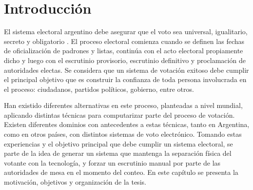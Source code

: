 \label{Introduccion}
\chapter{Introducción}
El sistema electoral argentino debe asegurar que el voto sea universal, igualitario, secreto y obligatorio \citep{arlettaz2012libertad}. El proceso electoral comienza cuando se definen las fechas de oficialización de padrones y listas, continúa con el acto electoral propiamente dicho y luego con el escrutinio provisorio, escrutinio definitivo y proclamación de autoridades electas. Se considera que un sistema de votación exitoso debe cumplir el principal objetivo que es construir la confianza de toda persona involucrada en el proceso: ciudadanos, partidos políticos, gobierno, entre otros. 

Han existido diferentes alternativas en este proceso, planteadas a nivel mundial, aplicando distintas técnicas para computarizar parte del proceso de votación. Existen diferentes dominios con antecedentes a estas técnicas, tanto en Argentina, como en  otros  países,  con  distintos  sistemas  de  voto  electrónico. Tomando estas experiencias y el objetivo principal que debe cumplir un sistema electoral, se parte de la idea de generar un sistema que mantenga la separación física del votante con la tecnología, y forzar un escrutinio manual por parte de las autoridades de mesa en el momento del conteo. \newline
En este capítulo se presenta la motivación, objetivos y organización de la tesis.

